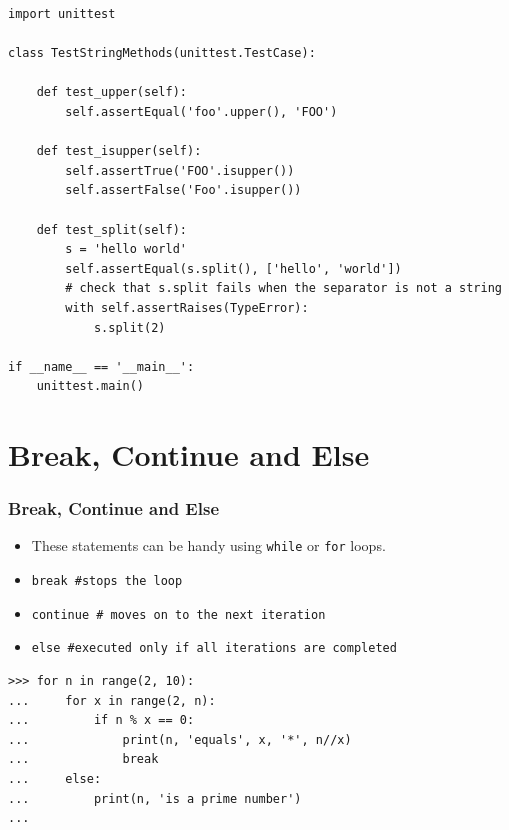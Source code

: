 \documentclass[xcolor=x11names,compress]{beamer}
\renewcommand{\(}{\begin{columns}}
\renewcommand{\)}{\end{columns}}
\newcommand{\<}[1]{\begin{column}{#1}}
\renewcommand{\>}{\end{column}}
\begin{document}
\begin{frame}[fragile]
\begin{scriptsize}
	\begin{verbatim}
import unittest

class TestStringMethods(unittest.TestCase):

    def test_upper(self):
        self.assertEqual('foo'.upper(), 'FOO')

    def test_isupper(self):
        self.assertTrue('FOO'.isupper())
        self.assertFalse('Foo'.isupper())

    def test_split(self):
        s = 'hello world'
        self.assertEqual(s.split(), ['hello', 'world'])
        # check that s.split fails when the separator is not a string
        with self.assertRaises(TypeError):
            s.split(2)

if __name__ == '__main__':
    unittest.main()
	\end{verbatim}	
\end{scriptsize}
\end{frame}

\section{Break, Continue and Else}

\begin{frame}[fragile]
\frametitle{Break, Continue and Else}
\begin{itemize}
\item These statements can be handy using \texttt{while} or \texttt{for} loops. \pause
\item \texttt{break \#stops the loop} \pause
\item \texttt{continue \# moves on to the next iteration} \pause
\item \texttt{else \#executed only if all iterations are completed} \pause
\end{itemize}
\begin{verbatim}
>>> for n in range(2, 10):
...     for x in range(2, n):
...         if n % x == 0:
...             print(n, 'equals', x, '*', n//x)
...             break
...     else:
...         print(n, 'is a prime number')
...
\end{verbatim}
\end{frame}
\end{document}
